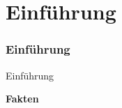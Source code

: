 %

\section{Einführung}
\begin{frame}[fragile]
	\frametitle{Einführung}

	\begin{center}\huge{Einführung}\end{center}
	\begin{center}\huge{\color{typo3darkgrey}\textbf{Fakten}}\end{center}

\end{frame}


